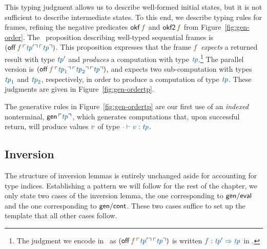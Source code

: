 This typing judgment allows us to describe well-formed initial states,
but it is not sufficient to describe intermediate states. To this end,
we describe typing rules for frames, refining the negative predicates
${\sf okf}\,\lf{f}$ and ${\sf okf2}\,\lf{f}$ from
Figure~\ref{fig:gen-order}. The \sls~proposition describing well-typed
sequential frames is $({\sf off}\,\lf{f}\,\interp{{\it
    tp}'}\,\interp{\it tp})$. This proposition expresses that the frame
$\lf{f}$ {\it expects} a returned result with type $\obj{\it tp'}$ and
{\it produces} a computation with type $\obj{{\it tp}}$.\footnote{The
  judgment we encode in \sls~as $({\sf off}\,\lf{f}\,\interp{{\it
      tp}'}\,\interp{\it tp})$ is written $\obj{f : {\it tp}'
    \Rightarrow {\it tp}}$ in \cite[Chapter 27]{harper12practical}.}
The parallel version is $({\sf off}\,\lf{f}\,\interp{{\it
    tp}_1}\,\interp{{\it tp}_2}\,\interp{\it tp})$, and expects two
sub-computation with types $\obj{{\it tp}_1}$ and $\obj{{\it tp}_2}$,
respectively, in order to produce a computation of type $\obj{{\it
    tp}}$. These judgments are given in Figure~\ref{fig:gen-ordertp}. 

The generative rules in Figure~\ref{fig:gen-ordertp} are our first use
of an {\it indexed} nonterminal, ${\sf gen}\,\interp{\it tp}$, which
generates computations that, upon successful return, will produce
values $\obj{v}$ of type $\obj{\cdot \vdash v : {\it tp}}$. 

\subsection{Inversion}

The structure of inversion lemmas is entirely unchanged
aside for accounting for type indices. Establishing
a pattern we will follow for the rest of the chapter, we only state
two cases of the inversion lemma, the one corresponding to 
${\sf gen/eval}$ and the one corresponding to ${\sf gen/cont}$. 
These two cases suffice to set up the template that all other cases
follow. 

